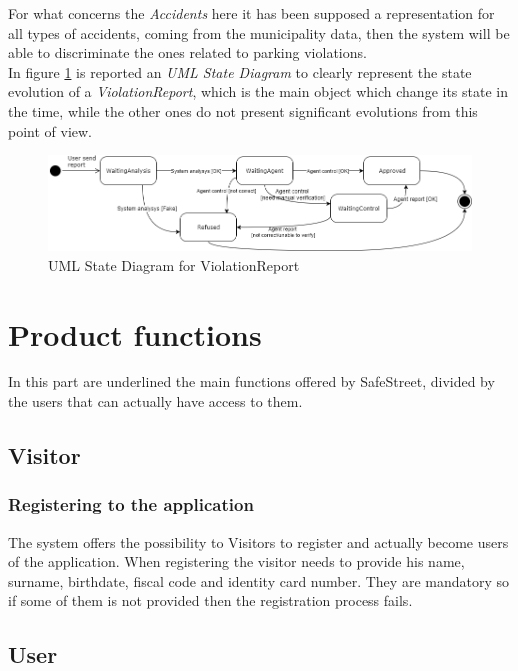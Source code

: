 \documentclass[a4paper]{report}
\begin{document}
For what concerns the \textit{Accidents} here it has been supposed a representation for all types of accidents, coming from the municipality data, then the system will be able to discriminate the ones related to parking violations.\\
In figure \ref{fig:state-diagram1} is reported an \textit{UML State Diagram} to clearly represent the state evolution of a \textit{ViolationReport}, which is the main object which change its state in the time, while the other ones do not present significant evolutions from this point of view.
\begin{figure}[hp]
\centering
\includegraphics[angle=90, scale=0.6]{StateReport}
\caption{UML State Diagram for ViolationReport}
\label{fig:state-diagram1}
\end{figure}

\section{Product functions}
In this part are underlined the main functions offered by SafeStreet, divided by the users that can actually have access to them.

\subsection{Visitor}

\subsubsection{Registering to the application}

The system offers the possibility to Visitors to register and actually become users of the application. When registering the visitor needs to provide his name, surname, birthdate, fiscal code and identity card number. They are mandatory so if some of them is not provided then the registration process fails.
 
\subsection{User}
\end{document}

